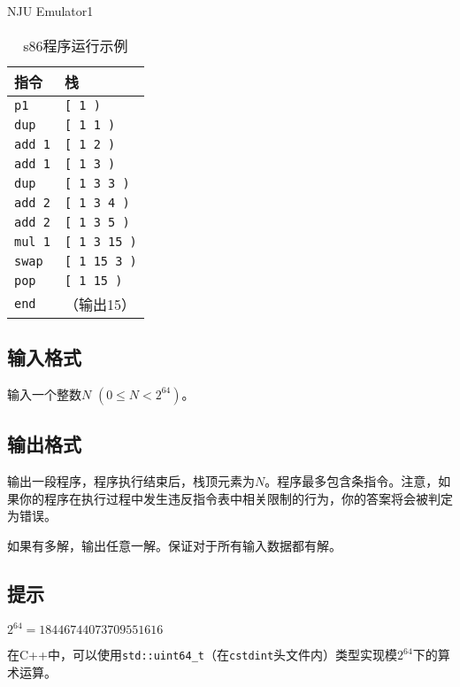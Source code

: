 \begin{Problem}{NJU Emulator}{1}
\begin{table}[htbp]
\centering
\begin{tabular}{ll}
\hline
指令 & 栈  \\ \hline
\texttt{p1} & \texttt{[ 1 )} \\ 
\texttt{dup} & \texttt{[ 1 1 )} \\
\texttt{add 1} & \texttt{[ 1 2 )} \\
\texttt{add 1} & \texttt{[ 1 3 )} \\
\texttt{dup} & \texttt{[ 1 3 3 )} \\
\texttt{add 2} & \texttt{[ 1 3 4 )} \\
\texttt{add 2} & \texttt{[ 1 3 5 )} \\
\texttt{mul 1} & \texttt{[ 1 3 15 )} \\
\texttt{swap} & \texttt{[ 1 15 3 )} \\
\texttt{pop} & \texttt{[ 1 15 )} \\
\texttt{end} & （输出15） \\ \hline
\end{tabular}
\caption{s86程序运行示例}
\end{table}

\subsection*{输入格式}

输入一个整数$N$ $(0 \leq N < 2^{64})$。

\subsection*{输出格式}

输出一段程序，程序执行结束后，栈顶元素为$N$。程序最多包含条指令。注意，如果你的程序在执行过程中发生违反指令表中相关限制的行为，你的答案将会被判定为错误。

如果有多解，输出任意一解。保证对于所有输入数据都有解。

\setcounter{ExampleNo}{0}


\subsection*{提示}

$2^{64} = 18 446 744 073 709 551 616$

在C++中，可以使用\verb|std::uint64_t|（在\texttt{cstdint}头文件内）类型实现模$2^{64}$下的算术运算。

\end{Problem}

